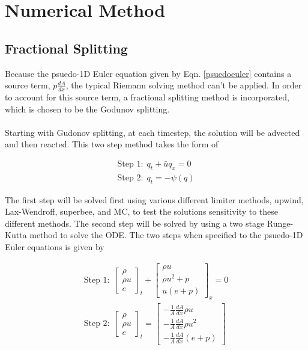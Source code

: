 \documentclass[11pt]{article}%
\numberwithin{equation}{section}
\begin{document}
\section{Numerical Method}

\subsection{Fractional Splitting}
Because the psuedo-1D Euler equation given by Eqn. \ref{psuedoeuler} contains a source term, $p \frac{dA}{dx}$, the typical Riemann solving method can't be applied. In order to account for this source term, a fractional splitting method is incorporated, which is chosen to be the Godunov splitting.
\\
\\
Starting with Gudonov splitting, at each timestep, the solution will be advected and then reacted. This two step method takes the form of

\begin{equation}
\begin{split}
\text{Step 1:} \ \ q_t + \bar{u} q_x = 0 \\
\text{Step 2:} \ \ q_t = -\psi(q)
\end{split}
\end{equation}  

The first step will be solved first using various different limiter methods, upwind, Lax-Wendroff, superbee, and MC, to test the solutions sensitivity to these different methods. The second step will be solved by using a two stage Runge-Kutta method to solve the ODE. The two steps when specified to the psuedo-1D Euler equations is given by

\begin{equation}
\begin{split}
\text{Step 1:} \ \ \left[ \begin{array}{c} \rho  \\ \rho u  \\ e \end{array} \right]_t +  \left[ \begin{array}{c} \rho u  \\ \rho u^2 + p \\ u(e + p) \end{array} \right]_x =  0 \\
\text{Step 2:} \ \ \left[ \begin{array}{c} \rho  \\ \rho u  \\ e  \end{array} \right]_t = \left[ \begin{array}{c} -\frac{1}{A}\frac{dA}{dx} \rho u \\ -\frac{1}{A} \frac{dA}{dx} \rho u^2  \\ -\frac{1}{A} \frac{dA}{dx}  (e + p)  \end{array} \right]    \end{split}
\label{eq:splitting}
\end{equation}
\end{document}
